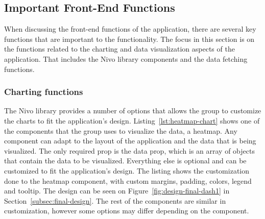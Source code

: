\subsection{Important Front-End Functions}\label{subsec:important-front-end-functions}

When discussing the front-end functions of the application, there are several key functions that are important to the
functionality.
The focus in this section is on the functions related to the charting and data visualization aspects of the application.
That includes the Nivo library components and the data fetching functions.

\subsubsection{Charting functions}\label{subsubsec:charting-functions}

The Nivo library provides a number of options that allows the group to customize the charts to fit the application's
design.
Listing~\ref{lst:heatmap-chart} shows one of the components that the group uses to visualize the data, a heatmap.
Any component can adapt to the layout of the application and the data that is being visualized.
The only required prop is the data prop, which is an array of objects that contain the data to be visualized.
Everything else is optional and can be customized to fit the application's design.
The listing shows the customization done to the heatmap component, with custom margins, padding, colors, legend and
tooltip.
The design can be seen on Figure~\ref{fig:design-final-dash1} in Section~\ref{subsec:final-design}.
The rest of the components are similar in customization, however some options may differ depending on the component.

